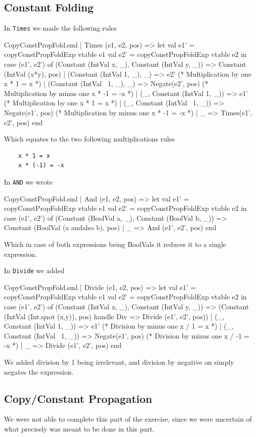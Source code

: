 \documentclass[11pt,a4paper,oneside]{report}
\begin{document}
\subsection*{Constant Folding}
In \texttt{Times} we made the following rules
\begin{code}[firstnumber=43]{CopyConstPropFold.sml}
      | Times (e1, e2, pos) =>
        let val e1' = copyConstPropFoldExp vtable e1
            val e2' = copyConstPropFoldExp vtable e2
        in case (e1', e2') of
          (Constant (IntVal x, _), Constant (IntVal y, _)) => Constant (IntVal (x*y), pos)
          | (Constant                 (IntVal 1, _), _)   =>
            e2' (* Multiplication by one x * 1 = x *)
          | (Constant (IntVal ~1, _), _)   =>
            Negate(e2', pos)          (* Multiplication by minus one x * -1 = -x *)
          | (_, Constant (IntVal 1, _))   =>
            e1'                       (* Multiplication by one x * 1 = x *)
          | (_, Constant (IntVal ~1, _))   =>
            Negate(e1', pos)          (* Multiplication by minus one x * -1 = -x *)
          | _                             =>
            Times(e1', e2', pos)
        end
\end{code}
Which equates to the two following multiplications rules
\begin{center}
  \begin{verbatim}
    x * 1 = x
    x * (-1) = -x
    \end{verbatim}
\end{center}

In \texttt{AND} we wrote
\begin{code}[firstnumber=59]{CopyConstPropFold.sml}
      | And (e1, e2, pos) =>
        let val e1' = copyConstPropFoldExp vtable e1
            val e2' = copyConstPropFoldExp vtable e2
        in case (e1', e2') of
               (Constant (BoolVal a, _), Constant (BoolVal b, _)) =>
               Constant (BoolVal (a andalso b), pos)
             | _ => And (e1', e2', pos)
        end
\end{code}
Which in case of both expressions being BoolVals it reduces it to a single expression.

In \texttt{Divide} we added
\begin{code}[firstnumber=139]{CopyConstPropFold.sml}
      | Divide (e1, e2, pos) =>
        let val e1' = copyConstPropFoldExp vtable e1
            val e2' = copyConstPropFoldExp vtable e2
        in case (e1', e2') of
               (Constant (IntVal x, _), Constant (IntVal y, _)) =>
                 (Constant (IntVal (Int.quot (x,y)), pos)
                   handle Div => Divide (e1', e2', pos))
              | (_, Constant (IntVal 1, _)) =>
                e1' (* Division by minus one x / 1 = x *)
              | (_, Constant (IntVal ~1, _)) =>
                Negate(e1', pos) (* Division by minus one x / -1 = -x *)
              | _ => Divide (e1', e2', pos)
        end
\end{code}
We added division by 1 being irrelevant, and division by negative on simply negates the expression.


\subsection*{Copy/Constant Propagation}

We were not able to complete this part of the exercise, since we were uncertain of what precisely was meant to be done in this part.
\end{document}
